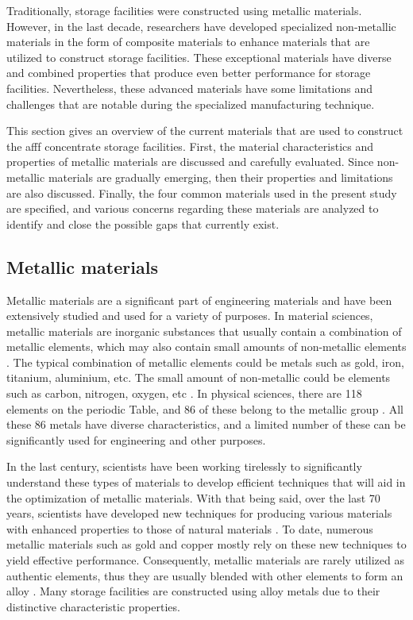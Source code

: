 Traditionally, storage facilities were constructed using metallic materials. However, in the last decade, researchers have developed specialized non-metallic materials in the form of composite materials to enhance materials that are utilized to construct storage facilities. These exceptional materials have diverse and combined properties that produce even better performance for storage facilities. Nevertheless, these advanced materials have some limitations and challenges that are notable during the specialized manufacturing technique.

This section gives an overview of the current materials that are used to construct the \acrshort{afff} concentrate storage facilities. First, the material characteristics and properties of metallic materials are discussed and carefully evaluated. Since non-metallic materials are gradually emerging, then their properties and limitations are also discussed. Finally, the four common materials used in the present study are specified, and various concerns regarding these materials are analyzed to identify and close the possible gaps that currently exist.

\subsection{Metallic materials}
Metallic materials are a significant part of engineering materials and have been extensively studied and used for a variety of purposes.  In material sciences, metallic materials are inorganic substances that usually contain a combination of metallic elements, which may also contain small amounts of non-metallic elements \cite{ali2020empirical}. The typical combination of metallic elements could be metals such as gold, iron, titanium, aluminium, etc. The small amount of non-metallic could be elements such as carbon, nitrogen, oxygen, etc \cite{hench2005biomaterials}. In physical sciences, there are 118 elements on the periodic Table, and 86 of these belong to the metallic group \cite{ali2020empirical}. All these 86 metals have diverse characteristics, and a limited number of these can be significantly used for engineering and other purposes.

In the last century, scientists have been working tirelessly to significantly understand these types of materials to develop efficient techniques that will aid in the optimization of metallic materials. With that being said, over the last 70 years, scientists have developed new techniques for producing various materials with enhanced properties to those of natural materials \cite{ali2020empirical}. To date, numerous metallic materials such as gold and copper mostly rely on these new techniques to yield effective performance. Consequently, metallic materials are rarely utilized as authentic elements, thus they are usually blended with other elements to form an alloy \cite{hench2005biomaterials}. Many storage facilities are constructed using alloy metals due to their distinctive characteristic properties.

